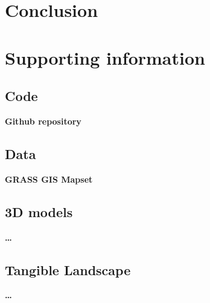 \documentclass[final,3p,times,twocolumn]{elsarticle}
\begin{document}
\section{Conclusion}

\appendix

\section{Supporting information}

\subsection{Code}\label{code}
{\bf Github repository}

\subsection{Data}\label{data}
{\bf GRASS GIS Mapset}

\subsection{3D models}\label{3d_models}
{\bf \ldots}

\subsection{Tangible Landscape}\label{tangible_landscape}
{\bf \ldots}


% 
 
% 
% 
% 
% 
% 
% 
% 
% 
% 
% 
% 


\end{document}
